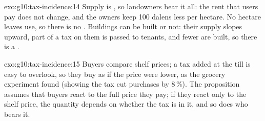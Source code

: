 \begin{solution}{exo:g10:tax-incidence:14}
Supply is , so landowners bear it all: the rent that users pay does not change, and the owners keep 100 dalens less per hectare. No hectare leaves use, so there is no
. Buildings can be built or not: their supply slopes upward, part of a tax on them is passed to tenants, and fewer are built, so there is a .
\end{solution}

\begin{solution}{exo:g10:tax-incidence:15}
Buyers compare shelf prices; a tax added at the till is easy to overlook, so they buy as if the price were lower, as the grocery experiment found (showing the tax cut purchases by 8\,\%). The
proposition assumes that buyers react to the full price they pay; if they react only to the shelf price, the quantity depends on whether the tax is in it, and so does who bears it.
\end{solution}

